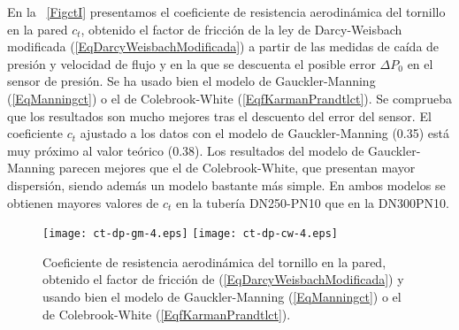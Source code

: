\documentclass[a4paper]{article}
\begin{document}
En la \figurename~\ref{FigctI} presentamos el coeficiente de resistencia
aerodinámica del tornillo en la pared $c_t$, obtenido el factor de fricción de
la ley de Darcy-Weisbach modificada (\ref{EqDarcyWeisbachModificada}) a partir
de las medidas de caída de presión y velocidad de flujo y en la que se descuenta
el posible error $\Delta P_0$ en el sensor de presión. Se ha usado bien el
modelo de Gauckler-Manning (\ref{EqManningct}) o el de Colebrook-White
(\ref{EqfKarmanPrandtlct}). Se comprueba que los resultados son mucho mejores
tras el descuento del error del sensor. El coeficiente $c_t$ ajustado a los
datos con el modelo de Gauckler-Manning (0.35) está muy próximo al valor teórico
(0.38). Los resultados del modelo de Gauckler-Manning parecen mejores que el de
Colebrook-White, que presentan mayor dispersión, siendo además un modelo
bastante más simple. En ambos modelos se obtienen mayores valores de $c_t$ en la
tubería DN250-PN10 que en la DN300PN10. 
\begin{figure}[ht!]
\centering
\texttt{[image: ct-dp-gm-4.eps]}
\texttt{[image: ct-dp-cw-4.eps]}
\caption
{
  Coeficiente de resistencia aerodinámica del tornillo en la pared, obtenido el
  factor de fricción de (\ref{EqDarcyWeisbachModificada}) y usando bien el
  modelo de Gauckler-Manning (\ref{EqManningct}) o el de Colebrook-White
  (\ref{EqfKarmanPrandtlct}).\label{FigctII}
}
\end{figure}
\end{document}
